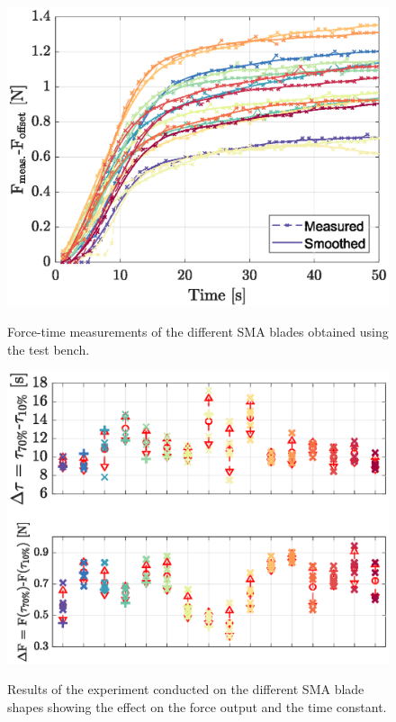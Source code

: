 \begin{figure}[H]
  \centering
  \begin{minipage}{.45\textwidth}
    \centering
    \vspace{-10pt}
    \includegraphics[width=\textwidth]{Figures/TB_Measurements.eps}
    \vspace{-20pt}
    \caption{Force-time measurements of the different SMA blades obtained using the test bench.}
		\vspace{-10pt}
    \label{fig:TB_Measurements}
  \end{minipage}%
  \hfill
  \begin{minipage}{.47\textwidth}
    \centering
    \vspace{-6pt}
    \includegraphics[width=\textwidth]{Figures/Had_RawData.eps}
    \vspace{-26pt}
    \caption{Results of the experiment conducted on the different SMA blade shapes showing the effect on the force output and the time constant.}
    \vspace{-10pt}
     \label{fig:Had_RawData}
  \end{minipage}
\end{figure}


